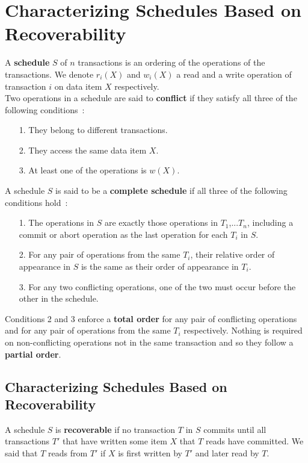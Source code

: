 \section{Characterizing Schedules Based on Recoverability}
A \textbf{schedule} $S$ of $n$ transactions is an ordering of the operations of the transactions. We denote $r_i(X)$ and $w_i(X)$ a read and a write operation of transaction $i$ on data item $X$ respectively. \\

Two operations in a schedule are said to \textbf{conflict} if they satisfy all three of the following conditions~:
\begin{itemize}
    \item[1.] They belong to different transactions.
    \item[2.] They access the same data item $X$.
    \item[3.] At least one of the operations is $w(X)$.
\end{itemize}

A schedule $S$ is said to be a \textbf{complete schedule} if all three of the following conditions hold~:
\begin{itemize}
    \item[1.] The operations in $S$ are exactly those operations in $T_1$,...$T_n$, including a commit or abort operation as the last operation for each $T_i$ in $S$.
    \item[2.] For any pair of operations from the same $T_i$, their relative order of appearance in $S$ is the same as their order of appearance in $T_i$.
    \item[3.] For any two conflicting operations, one of the two must occur before the other in the schedule.
\end{itemize}
Conditions 2 and 3 enforce a \textbf{total order} for any pair of conflicting operations and for any pair of operations from the same $T_i$ respectively. Nothing is required on non-conflicting operations not in the same transaction and so they follow a \textbf{partial order}.

\subsection{Characterizing Schedules Based on Recoverability}
A schedule $S$ is \textbf{recoverable} if no transaction $T$ in $S$ commits until all transactions $T'$ that have written some item $X$ that $T$ reads have committed. We said that $T$ reads from $T'$ if $X$ is first written by $T'$ and later read by $T$. \\

